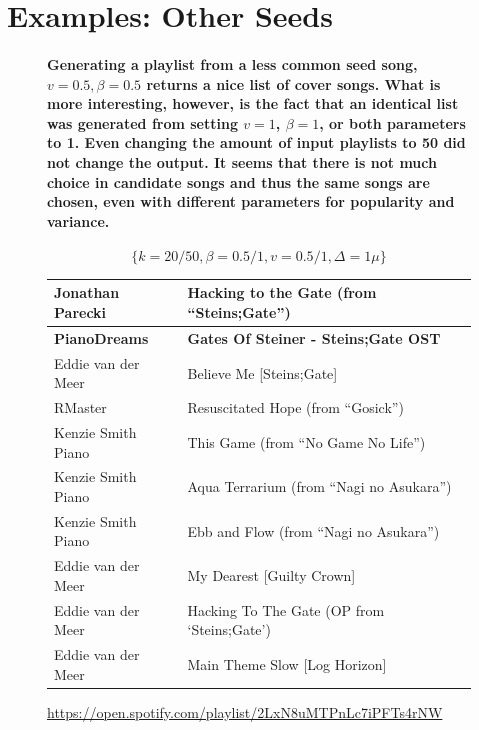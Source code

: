 \documentclass[a4paper, 12pt]{report}
\begin{document}
\section{Examples: Other Seeds}
\begin{figure}[H]
    \paragraph{Generating a playlist from a less common seed song, \(v = 0.5, \beta = 0.5\) returns a nice list of cover songs. What is more interesting, however, is the fact that
an identical list was generated from setting \(v = 1\), \(\beta = 1\), or both parameters to 1. Even changing the amount of input playlists to 50 did not change the output.
It seems that there is not much choice in candidate songs and thus the same songs are chosen, even with different parameters for popularity and variance.}
\[\{k = 20/50, \beta = 0.5/1, v = 0.5/1, \Delta = 1\mu\}\]
    \begin{center}
        \begin{tabulary}{\linewidth}{|@{\makebox[2em][c]{\rownumber}}|L|L|} 
            \hline
            Jonathan Parecki & Hacking to the Gate (from ``Steins;Gate'') \\ 
            \hline
            \textbf{PianoDreams} & \textbf{Gates Of Steiner - Steins;Gate OST} \\
            \hline
            Eddie van der Meer & Believe Me [Steins;Gate] \\
            \hline
            RMaster & Resuscitated Hope (from ``Gosick'') \\
            \hline
            Kenzie Smith Piano & This Game (from ``No Game No Life'') \\
            \hline
            Kenzie Smith Piano & Aqua Terrarium (from ``Nagi no Asukara'') \\
            \hline
            Kenzie Smith Piano & Ebb and Flow (from ``Nagi no Asukara'') \\
            \hline
            Eddie van der Meer & My Dearest [Guilty Crown] \\
            \hline
            Eddie van der Meer & Hacking To The Gate (OP from `Steins;Gate') \\
            \hline
            Eddie van der Meer & Main Theme Slow [Log Horizon] \\
            \hline
        \end{tabulary}
    \caption{\url{https://open.spotify.com/playlist/2LxN8uMTPnLc7iPFTs4rNW}}
    \label{fig:steins}
    \end{center}
\end{figure}
\end{document}
